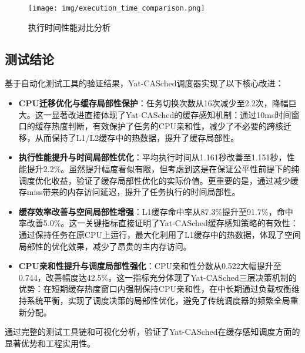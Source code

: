\begin{figure}[H]
\centering
\texttt{[image: img/execution\_time\_comparison.png]}

\caption{执行时间性能对比分析}
\label{fig:execution-time}
\end{figure}




\subsection{测试结论}

基于自动化测试工具的验证结果，Yat-CASched调度器实现了以下核心改进：

\begin{itemize}
    \item \textbf{CPU迁移优化与缓存局部性保护}：任务切换次数从16次减少至2.2次，降幅巨大。这一显著改进直接体现了Yat-CASched的缓存感知机制：通过10ms时间窗口的缓存热度判断，有效保护了任务的CPU亲和性，减少了不必要的跨核迁移，从而保持了L1/L2缓存中的热数据，提升了缓存局部性。
    
    \item \textbf{执行性能提升与时间局部性优化}：平均执行时间从1.161秒改善至1.151秒，性能提升2.2\%。虽然提升幅度看似有限，但考虑到这是在保证公平性前提下的纯调度优化收益，验证了缓存局部性优化的实际价值。更重要的是，通过减少缓存miss带来的内存访问延迟，提升了任务执行的时间局部性。
    
    \item \textbf{缓存效率改善与空间局部性增强}：L1缓存命中率从87.3\%提升至91.7\%，命中率改善5.0\%。这一关键指标直接证明了Yat-CASched缓存感知策略的有效性：通过保持任务在原CPU上运行，最大化利用了L1缓存中的热数据，体现了空间局部性的优化效果，减少了昂贵的主内存访问。
    
    \item \textbf{CPU亲和性提升与调度局部性强化}：CPU亲和性分数从0.522大幅提升至0.744，改善幅度达42.5\%。这一指标充分体现了Yat-CASched三层决策机制的优势：在短期缓存热度窗口内强制保持CPU亲和性，在中长期通过负载权衡维持系统平衡，实现了调度决策的局部性优化，避免了传统调度器的频繁全局重新分配。
\end{itemize}

通过完整的测试工具链和可视化分析，验证了Yat-CASched在缓存感知调度方面的显著优势和工程实用性。
